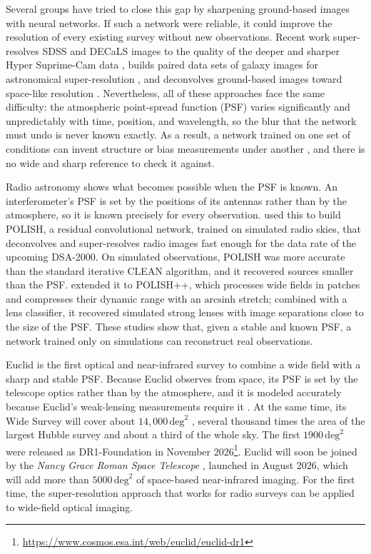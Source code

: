 \documentclass[linenumbers,trackchanges,twocolumn]{aastex701}
\begin{document}
Several groups have tried to close this gap by sharpening ground-based images with neural networks.
If such a network were reliable, it could improve the resolution of every existing survey without new observations.
Recent work super-resolves SDSS and DECaLS images to the quality of the deeper and sharper Hyper Suprime-Cam data \citep{Luo2025}, builds paired data sets of galaxy images for astronomical super-resolution \citep{Miao2024}, and deconvolves ground-based images toward space-like resolution \citep{Akhaury2024}.
Nevertheless, all of these approaches face the same difficulty: the atmospheric point-spread function (PSF) varies significantly and unpredictably with time, position, and wavelength, so the blur that the network must undo is never known exactly.
As a result, a network trained on one set of conditions can invent structure or bias measurements under another \citep{Akhaury2024}, and there is no wide and sharp reference to check it against.

Radio astronomy shows what becomes possible when the PSF is known.
An interferometer's PSF is set by the positions of its antennas rather than by the atmosphere, so it is known precisely for every observation.
\citet{Connor2022} used this to build POLISH, a residual convolutional network, trained on simulated radio skies, that deconvolves and super-resolves radio images fast enough for the data rate of the upcoming DSA-2000.
On simulated observations, POLISH was more accurate than the standard iterative CLEAN algorithm, and it recovered sources smaller than the PSF.
\citet{Wu2026} extended it to POLISH++, which processes wide fields in patches and compresses their dynamic range with an $\mathrm{arcsinh}$ stretch; combined with a lens classifier, it recovered simulated strong lenses with image separations close to the size of the PSF.
These studies show that, given a stable and known PSF, a network trained only on simulations can reconstruct real observations.

Euclid is the first optical and near-infrared survey to combine a wide field with a sharp and stable PSF.
Because Euclid observes from space, its PSF is set by the telescope optics rather than by the atmosphere, and it is modeled accurately because Euclid's weak-lensing measurements require it \citep{Mellier2025}.
At the same time, its Wide Survey will cover about $14{,}000\,\mathrm{deg}^2$ \citep{Mellier2025}, several thousand times the area of the largest Hubble survey and about a third of the whole sky.
The first $1900\,\mathrm{deg}^2$ were released as DR1-Foundation in November 2026\footnote{\url{https://www.cosmos.esa.int/web/euclid/euclid-dr1}}.
Euclid will soon be joined by the \emph{Nancy Grace Roman Space Telescope} \citep{ROTAC2025}, launched in August 2026, which will add more than $5000\,\mathrm{deg}^2$ of space-based near-infrared imaging.
For the first time, the super-resolution approach that works for radio surveys can be applied to wide-field optical imaging.
\end{document}
